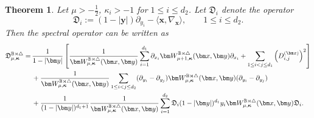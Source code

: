 \documentclass{amsart}
\newtheorem{thm}{Theorem}[section]
\theoremstyle{remark}
\def\la{{\langle}}
\def\ra{{\rangle}}
\def\fD{{\mathfrak D}}
\def\k{{\kappa}}
\def\la{{\langle}}
\def\ra{{\rangle}}
\def\BB{{\mathbb B}}
\def\bk{{\boldsymbol{\kappa}}}
\def\f{\frac}
\begin{document}
\begin{thm}\label{cor:diff-eqnV}
Let  $\mu > -\f12$, $\k_i > -1$ for $1 \le i \le d_2$. Let $\fD_i$ denote the operator 
$$
  \fD_i  := (1-|\bm y|) \partial_{y_i} - \la \bm x, \nabla_{\bm x} \ra, \qquad 1 \le i \le d_2.
$$
Then the spectral operator can be written as 
\begin{align} \label{eq:diff-eqn2}
  \fD_{\mu, \bk}^{\BB\rtimes \triangle} = \, & \frac{1}{1-|\bm y|} \left[   \frac{1}{\bm W_{\mu,\bk}^{\BB\rtimes \triangle}(\bm x, \bm y)}
  \sum_{i=1}^{d_1} \partial_{x_i} \bm W_{\mu+1,\bk}^{\BB\rtimes \triangle}(\bm x, \bm y) \partial_{x_i} 
  +  \sum_{1 \le i< j \le d_1} \left(D_{i,j}^{(\bm x)}\right)^2 \right] \notag \\
  & + \frac{1}{\bm W_{\mu,\bk}^{\BB\rtimes \triangle}(\bm x, \bm y)}  
  \sum_{1\le i< j \le d_2} (\partial_{y_i} - \partial_{y_j}) \bm W_{\mu,\bk}^{\BB\rtimes \triangle}(\bm x, \bm y)
   (\partial_{y_i} - \partial_{y_j}) \\
   & +  \frac{1}{(1-|\bm y|)^{d_1+1}} \frac{1}{\bm W_{\mu,\bk}^{\BB\rtimes \triangle}(\bm x, \bm y)}  \sum_{i=1}^{d_2}  
\fD_i  (1-|\bm y|)^{d_1} y_i \bm W_{\mu,\bk}^{\BB\rtimes \triangle}(\bm x, \bm y) \fD_i. \notag 
 \end{align}
 \end{thm}
\end{document}
